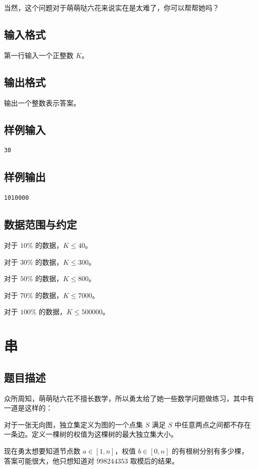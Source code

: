 \documentclass[11pt, a4paper]{article}
\begin{document}
当然，这个问题对于萌萌哒六花来说实在是太难了，你可以帮帮她吗？
\subsection{输入格式}
第一行输入一个正整数 $K$。
\subsection{输出格式}
输出一个整数表示答案。

\subsection{样例输入}
\begin{verbatim}
30
\end{verbatim}
\subsection{样例输出}
\begin{verbatim}
1010000
\end{verbatim}

\subsection{数据范围与约定}

对于 $10\%$ 的数据，$K \leq 40$。

对于 $30\%$ 的数据，$K \leq 300$。

对于 $50\%$ 的数据，$K \leq 800$。

对于 $70\%$ 的数据，$K \leq 7000$。

对于 $100\%$ 的数据，$K \leq 500000$。
\newpage
\section{串}

\subsection{题目描述}
众所周知，萌萌哒六花不擅长数学，所以勇太给了她一些数学问题做练习，其中有一道是这样的：

对于一张无向图，独立集定义为图的一个点集 $S$ 满足 $S$ 中任意两点之间都不存在一条边。定义一棵树的权值为这棵树的最大独立集大小。

现在勇太想要知道节点数 $a \in [1,n]$，权值 $b \in [0,n]$ 的有根树分别有多少棵，答案可能很大，他只想知道对 $998244353$ 取模后的结果。
\end{document}
